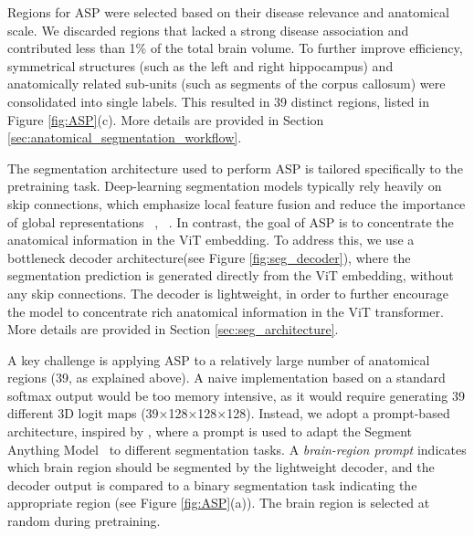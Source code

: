 \documentclass[pdflatex,sn-nature]{sn-jnl}%
\newif\ifhighlight
\newcommand{\rev}[1]{\ifhighlight{\color{blue}{}#1}\else#1\fi}%
\newcommand{\revdel}[1]{\ifhighlight{\color{red}\sout{#1}}\fi}
\theoremstyle{thmstyleone}%
\theoremstyle{thmstyletwo}%
\theoremstyle{thmstylethree}%
\begin{document}
Regions for ASP were selected based on their disease relevance and anatomical scale. We discarded regions that lacked a strong disease association and contributed less than 1\% of the total brain volume. To further improve efficiency, symmetrical structures (such as the left and right hippocampus) and anatomically related sub-units (such as segments of the corpus callosum) were consolidated into single labels. This resulted in 39 distinct regions, listed in Figure \ref{fig:ASP}(c). More details are provided in \revdel{the Appendix} Section \ref{sec:anatomical_segmentation_workflow}.

The segmentation architecture used to perform ASP is tailored specifically to the pretraining task. Deep-learning segmentation models typically rely heavily on skip connections, which emphasize local feature fusion and reduce the importance of global representations ~\cite{ronneberger2015u}, ~\cite{hatamizadeh2022unetr}. In contrast, the goal of ASP is to concentrate the anatomical information in the ViT embedding. To address this, we use a bottleneck decoder architecture(see Figure \ref{fig:seg_decoder}), where the segmentation prediction is generated directly from the ViT embedding, without any skip connections. The decoder is lightweight, in order to further encourage the model to concentrate rich anatomical information in the ViT transformer. More details are provided in \revdel{the Appendix} Section \ref{sec:seg_architecture}.

A key challenge is applying ASP to a relatively large number of anatomical regions (39, as explained above). A naive implementation based on a standard softmax output would be too memory intensive, as it would require generating 39 different 3D logit maps (39×128×128×128). Instead, we adopt a prompt-based architecture, inspired by \cite{liu2024uncertainty}, where a prompt is used to adapt the Segment Anything Model~\cite{kirillov2023segment} to different segmentation tasks. A \textit{brain-region prompt} indicates which brain region should be segmented by the lightweight decoder, and the decoder output is compared to a binary segmentation task indicating the appropriate region (see Figure \ref{fig:ASP}(a)). The brain region is selected at random during pretraining. 
\end{document}
